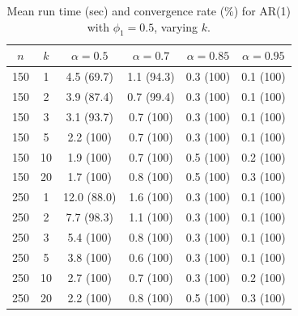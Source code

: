 \documentclass[10pt,twoside]{article}
\numberwithin{equation}{section}
\begin{document}
\begin{table}[htbp]

\begin{center}

\small

\caption{Mean run time (sec) and convergence rate (\%) for AR(1) with $\phi_1=0.5$, varying $k$.}

\label{tab:time1}

\begin{tabular}{|c|c|c|c|c|c|}

\hline

$n$ & $k$ & $\alpha = 0.5$ & $\alpha = 0.7$ & $\alpha = 0.85$ & $\alpha = 0.95$ \\ \hline

150 & 1 & 4.5 (69.7) & 1.1 (94.3) & 0.3 (100) & 0.1 (100) \\

150 & 2 & 3.9 (87.4) & 0.7 (99.4) & 0.3 (100) & 0.1 (100) \\

150 & 3 & 3.1 (93.7) & 0.7 (100) & 0.3 (100) & 0.1 (100) \\

150 & 5 & 2.2 (100) & 0.7 (100) & 0.3 (100) & 0.1 (100) \\

150 & 10 & 1.9 (100) & 0.7 (100) & 0.5 (100) & 0.2 (100) \\

150 & 20 & 1.7 (100) & 0.8 (100) & 0.5 (100) & 0.3 (100) \\ \hline

250 & 1 & 12.0 (88.0) & 1.6 (100) & 0.3 (100) & 0.1 (100) \\

250 & 2 & 7.7 (98.3) & 1.1 (100) & 0.3 (100) & 0.1 (100) \\

250 & 3 & 5.4 (100) & 0.8 (100) & 0.3 (100) & 0.1 (100) \\

250 & 5 & 3.8 (100) & 0.6 (100) & 0.3 (100) & 0.1 (100) \\

250 & 10 & 2.7 (100) & 0.7 (100) & 0.3 (100) & 0.2 (100) \\

250 & 20 & 2.2 (100) & 0.8 (100) & 0.5 (100) & 0.3 (100) \\ \hline

\end{tabular}

\end{center}

\end{table}
\end{document}
